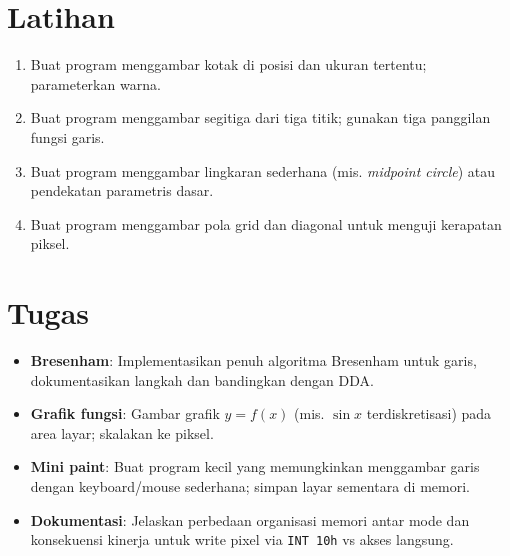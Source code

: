 \documentclass[../main.tex]{subfiles}
\begin{document}
\section{Latihan}
\begin{enumerate}
  \item Buat program menggambar kotak di posisi dan ukuran tertentu; parameterkan warna.
  \item Buat program menggambar segitiga dari tiga titik; gunakan tiga panggilan fungsi garis.
  \item Buat program menggambar lingkaran sederhana (mis. \textit{midpoint circle}) atau pendekatan parametris dasar.
  \item Buat program menggambar pola grid dan diagonal untuk menguji kerapatan piksel.
\end{enumerate}

\section{Tugas}
\begin{itemize}
  \item \textbf{Bresenham}: Implementasikan penuh algoritma Bresenham untuk garis, dokumentasikan langkah dan bandingkan dengan DDA.
  \item \textbf{Grafik fungsi}: Gambar grafik \(y=f(x)\) (mis. \(\sin x\) terdiskretisasi) pada area layar; skalakan ke piksel.
  \item \textbf{Mini paint}: Buat program kecil yang memungkinkan menggambar garis dengan keyboard/mouse sederhana; simpan layar sementara di memori.
  \item \textbf{Dokumentasi}: Jelaskan perbedaan organisasi memori antar mode dan konsekuensi kinerja untuk write pixel via \texttt{INT 10h} vs akses langsung.
\end{itemize}
\end{document}
